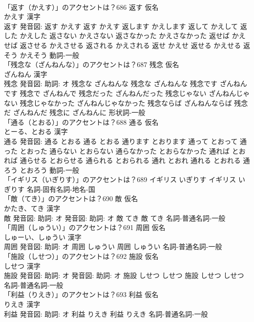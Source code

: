 \documentclass[8pt]{extreport}
\begin{document}
\begin{CJK}{UTF8}{min}
\\	「返す（かえす）」のアクセントは？686	返す 仮名　
\\	かえす 漢字　
\\	返す 発音図:	返す かえす		返す かえす 返します かえします 返して かえして 返した かえした 返さない かえさない 返さなかった かえさなかった 返せば かえせば 返させる かえさせる 返される かえされる 返せ かえせ 返せる かえせる 返そう かえそう				動詞-一般 
\\	「残念な（ざんねんな）」のアクセントは？687	残念 仮名　
\\	ざんねん 漢字　
\\	残念 発音図: 助詞: オ	残念な ざんねんな		残念な ざんねんな 残念です ざんねんです 残念で ざんねんで 残念だった ざんねんだった 残念じゃない ざんねんじゃない 残念じゃなかった ざんねんじゃなかった 残念ならば ざんねんならば 残念だ ざんねんだ 残念に ざんねんに				形状詞-一般 
\\	「通る（とおる）」のアクセントは？688	通る 仮名　
\\	とーる、とおる 漢字　
\\	通る 発音図:	通る とおる		通る とおる 通ります とおります 通って とおって 通った とおった 通らない とおらない 通らなかった とおらなかった 通れば とおれば 通らせる とおらせる 通られる とおられる 通れ とおれ 通れる とおれる 通ろう とおろう				動詞-一般 
\\	「イギリス（いぎりす）」のアクセントは？689		イギリス いぎりす		イギリス いぎりす				名詞-固有名詞-地名-国 
\\	「敵（てき）」のアクセントは？690	敵 仮名　
\\	かたき、てき 漢字　
\\	敵 発音図: 助詞: オ 発音図: 助詞: オ	敵 てき		敵 てき				名詞-普通名詞-一般 
\\	「周囲（しゅうい）」のアクセントは？691	周囲 仮名　
\\	しゅーい、しゅうい 漢字　
\\	周囲 発音図: 助詞: オ	周囲 しゅうい		周囲 しゅうい				名詞-普通名詞-一般 
\\	「施設（しせつ）」のアクセントは？692	施設 仮名　
\\	しせつ 漢字　
\\	施設 発音図: 助詞: オ 発音図: 助詞: オ	施設 しせつ しせつ		施設 しせつ しせつ				名詞-普通名詞-一般 
\\	「利益（りえき）」のアクセントは？693	利益 仮名　
\\	りえき 漢字　
\\	利益 発音図: 助詞: オ	利益 りえき		利益 りえき				名詞-普通名詞-一般 

\end{CJK}
\end{document}
